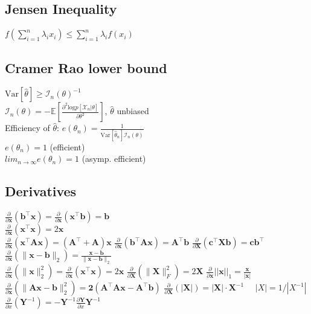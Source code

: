 \subsection*{Jensen Inequality}
$f(\sum_{i=1}^n \lambda_i x_i) \leq \sum_{i=1}^n \lambda_i f(x_i)$

\subsection*{Cramer Rao lower bound}
$\mathrm{Var}[\hat{\theta}]\geq \mathcal{I}_n(\theta)^{-1}$\\
$\mathcal{I}_n(\theta) = -\mathbb{E}[\frac{\partial^2 \mathrm{log}p[\mathcal{X}_n|\theta]}{\partial \theta^2}]$, $\hat{\theta}$ unbiased\\
Efficiency of $\hat{\theta}$: $e(\theta_n)=\frac{1}{\mathrm{Var}[\hat{\theta}_n]\mathcal{I}_n(\theta)}$\\
$e(\theta_n) = 1$ (efficient)\\
$lim_{n\rightarrow\infty}e(\theta_n) = 1$ (asymp. efficient)

\subsection*{Derivatives}
$\frac{\partial}{\partial \mathbf{x}}(\mathbf{b}^\top \mathbf{x}) = \frac{\partial}{\partial \mathbf{x}}(\mathbf{x}^\top \mathbf{b}) = \mathbf{b}$ \\
$\frac{\partial}{\partial \mathbf{x}}(\mathbf{x}^\top \mathbf{x}) = 2\mathbf{x}$ \\
$\frac{\partial}{\partial \mathbf{x}}(\mathbf{x}^\top \mathbf{A}\mathbf{x}) = (\mathbf{A}^\top + \mathbf{A})\mathbf{x}$ \quad
$\frac{\partial}{\partial \mathbf{x}}(\mathbf{b}^\top \mathbf{A}\mathbf{x}) = \mathbf{A}^\top \mathbf{b}$ \quad
$\frac{\partial}{\partial \mathbf{X}}(\mathbf{c}^\top \mathbf{X} \mathbf{b}) = \mathbf{c}\mathbf{b}^\top$ \quad
$\frac{\partial}{\partial \mathbf{x}}(\| \mathbf{x}-\mathbf{b} \|_2) = \frac{\mathbf{x}-\mathbf{b}}{\|\mathbf{x}-\mathbf{b}\|_2}$ \\
$\frac{\partial}{\partial \mathbf{x}}(\|\mathbf{x}\|^2_2) = \frac{\partial}{\partial \mathbf{x}} (\mathbf{x}^\top \mathbf{x}) = 2\mathbf{x}$ \quad
$\frac{\partial}{\partial \mathbf{X}}(\|\mathbf{X}\|_F^2) = 2\mathbf{X}$  \quad \quad
$\frac{\partial}{\partial \mathbf{x}}||\mathbf{x}||_1 = \frac{\mathbf{x}}{|\mathbf{x}|}$ \\
$\frac{\partial}{\partial \mathbf{x}}(\|\mathbf{Ax - b}\|_2^2) = \mathbf{2(A^\top Ax-A^\top b)}$ \quad
$\frac{\partial}{\partial \mathbf{X}}(|\mathbf{X}|) = |\mathbf{X}|\cdot \mathbf{X}^{-1}$ $\quad |X| = 1 / |X^{-1}|$\\
$\frac{\partial}{\partial x}(\mathbf{Y}^{-1}) = -\mathbf{Y}^{-1} \frac{\partial\mathbf{Y}}{\partial x} \mathbf{Y}^{-1}$
